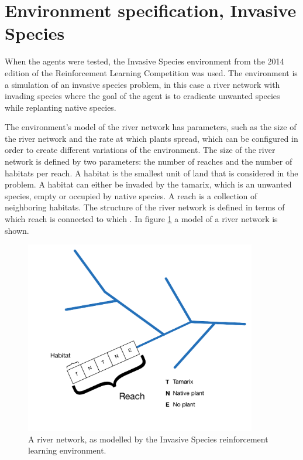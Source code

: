 \section{Environment specification, Invasive Species}
\label{sec:experiment_env}

When the agents were tested, the Invasive Species environment from the 2014 edition of
the Reinforcement Learning Competition was used. The environment is a
simulation of an invasive species problem, in this case a river network with
invading species where the goal of the agent is to eradicate unwanted species
while replanting native species. 

The environment's model of the river network has parameters, such as the size
of the river network and the rate at which plants spread, which can be
configured in order to create different variations of the environment.  The
size of the river network is defined by two parameters: the number of reaches
and the number of habitats per reach. A habitat is the smallest unit of land
that is considered in the problem. A habitat can either be invaded by the
tamarix, which is an unwanted species, empty or occupied by native species. A
reach is a collection of neighboring habitats. The structure of the river
network is defined in terms of which reach is connected to which
\parencite{invasiveSpecis2014:Online}. In figure \ref{fig:river} a model of a
river network is shown.

\begin{figure}[ht]
\centering
\includegraphics[width=0.9\textwidth]{images/river_network.pdf}
\caption{A river network, as modelled by the Invasive Species reinforcement learning environment.}
\label{fig:river}
\end{figure}

